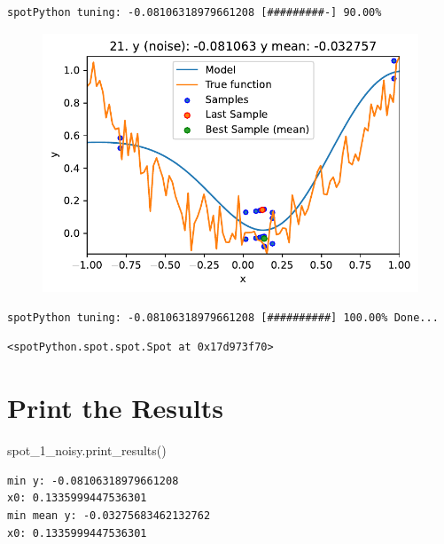 \documentclass[
  letterpaper,
  DIV=11,
  numbers=noendperiod]{scrreprt}
\newenvironment{Shaded}{\begin{snugshade}}{\end{snugshade}}
\newcommand{\NormalTok}[1]{\textcolor[rgb]{0.00,0.23,0.31}{#1}}
\begin{document}
\begin{verbatim}
spotPython tuning: -0.08106318979661208 [#########-] 90.00% 
\end{verbatim}

\begin{figure}[H]

{\centering \includegraphics{09_spot_ocba_files/figure-pdf/cell-6-output-10.pdf}

}

\end{figure}

\begin{verbatim}
spotPython tuning: -0.08106318979661208 [##########] 100.00% Done...
\end{verbatim}

\begin{verbatim}
<spotPython.spot.spot.Spot at 0x17d973f70>
\end{verbatim}

\hypertarget{print-the-results-4}{%
\section{Print the Results}\label{print-the-results-4}}

\begin{Shaded}
\begin{Highlighting}[]
\NormalTok{spot\_1\_noisy.print\_results()}
\end{Highlighting}
\end{Shaded}

\begin{verbatim}
min y: -0.08106318979661208
x0: 0.1335999447536301
min mean y: -0.03275683462132762
x0: 0.1335999447536301
\end{verbatim}
\end{document}
